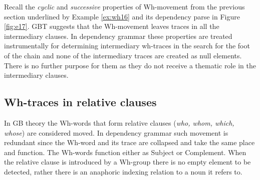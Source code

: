     Recall the \textit{cyclic} and \textit{successive} properties of Wh-movement from the previous section underlined by Example \ref{ex:wh16} and its dependency parse in Figure \ref{fig:e17}. GBT suggests that the Wh-movement leaves traces in all the intermediary clauses. In dependency grammar these properties are treated instrumentally for determining intermediary wh-traces in the search for the foot of the chain and none of the intermediary traces are created as null elements. There is no further purpose for them as they do not receive a thematic role in the intermediary clauses. 

\subsection{Wh-traces in relative clauses}
\label{sec:wh-traces-relative}
    In GB theory the Wh-words that form relative clauses (\textit{who, whom, which, whose}) are considered moved. In dependency grammar such movement is redundant since the Wh-word and its trace are collapsed and take the same place and function. The Wh-words function either as Subject or Complement. When the relative clause is introduced by a Wh-group there is no empty element to be detected, rather there is an anaphoric indexing relation to a noun it refers to. 

    \begin{table}[!ht]
    	\caption{The Wh-words introducing a relative clause.}
    	\label{tab:wh2}
    \end{table}

